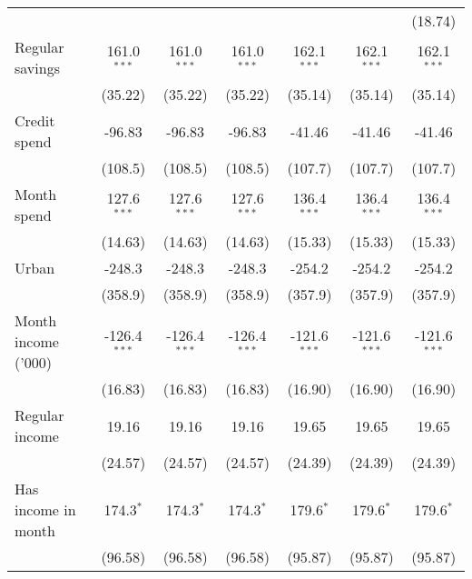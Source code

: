 \begin{table}[htbp]
\begin{footnotesize}
\begin{tabular}{lcccccc}
                                          &                &                &                &                &                 & (18.74)\\
         Regular savings                  & 161.0$^{***}$  & 161.0$^{***}$  & 161.0$^{***}$  & 162.1$^{***}$  & 162.1$^{***}$   & 162.1$^{***}$\\
                                          & (35.22)        & (35.22)        & (35.22)        & (35.14)        & (35.14)         & (35.14)\\
         Credit spend                     & -96.83         & -96.83         & -96.83         & -41.46         & -41.46          & -41.46\\
                                          & (108.5)        & (108.5)        & (108.5)        & (107.7)        & (107.7)         & (107.7)\\
         Month spend                      & 127.6$^{***}$  & 127.6$^{***}$  & 127.6$^{***}$  & 136.4$^{***}$  & 136.4$^{***}$   & 136.4$^{***}$\\
                                          & (14.63)        & (14.63)        & (14.63)        & (15.33)        & (15.33)         & (15.33)\\
         Urban                            & -248.3         & -248.3         & -248.3         & -254.2         & -254.2          & -254.2\\
                                          & (358.9)        & (358.9)        & (358.9)        & (357.9)        & (357.9)         & (357.9)\\
         Month income ('000)              & -126.4$^{***}$ & -126.4$^{***}$ & -126.4$^{***}$ & -121.6$^{***}$ & -121.6$^{***}$  & -121.6$^{***}$\\
                                          & (16.83)        & (16.83)        & (16.83)        & (16.90)        & (16.90)         & (16.90)\\
         Regular income                   & 19.16          & 19.16          & 19.16          & 19.65          & 19.65           & 19.65\\
                                          & (24.57)        & (24.57)        & (24.57)        & (24.39)        & (24.39)         & (24.39)\\
         Has income in month              & 174.3$^{*}$    & 174.3$^{*}$    & 174.3$^{*}$    & 179.6$^{*}$    & 179.6$^{*}$     & 179.6$^{*}$\\
                                          & (96.58)        & (96.58)        & (96.58)        & (95.87)        & (95.87)         & (95.87)\\

\end{tabular}
\end{footnotesize}
\end{table}
